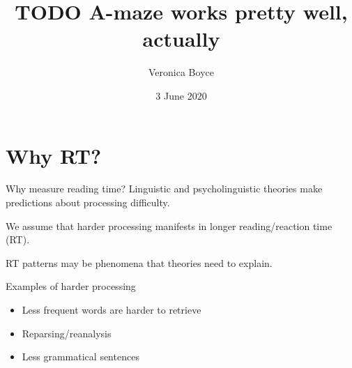 \documentclass[12pt, xcolor=beamer,table,dvipsnames, ignorenonframetext, ngerman]{beamer}
\title{TODO A-maze works pretty well, actually}
\author{Veronica Boyce}
\date{3 June 2020}
\begin{document}
\begin{frame}
\maketitle
\end{frame}

%
%
%
\section{Why RT?}
\begin{frame}{Why measure reading time?}
Linguistic and psycholinguistic theories make predictions about processing difficulty.
\medskip

We assume that harder processing manifests in longer reading/reaction time (RT).
\medskip

RT patterns may be phenomena that theories need to explain.

Examples of harder processing
\begin{itemize}
	\item Less frequent words are harder to retrieve
	\item Reparsing/reanalysis
	\item Less grammatical sentences
\end{itemize}
\end{frame}
\end{document}
